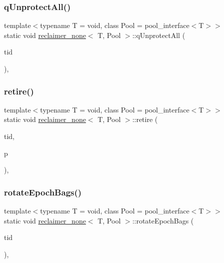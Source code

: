 \mbox{\label{classreclaimer__none_aeba1b3ef7a4aea47c3efb75a7547d0ce}} 
\subsubsection{\texorpdfstring{q\+Unprotect\+All()}{qUnprotectAll()}}
{\footnotesize\ttfamily template$<$typename T  = void, class Pool  = pool\+\_\+interface$<$\+T$>$$>$ \\
static void \hyperlink{classreclaimer__none}{reclaimer\+\_\+none}$<$ T, Pool $>$\+::q\+Unprotect\+All (\begin{DoxyParamCaption}\item[{const int}]{tid }\end{DoxyParamCaption})\hspace{0.3cm}{\ttfamily [inline]}, {\ttfamily [static]}}

\mbox{\label{classreclaimer__none_aa086c5d645d3ab8098b0015b9ed90489}} 
\subsubsection{\texorpdfstring{retire()}{retire()}}
{\footnotesize\ttfamily template$<$typename T  = void, class Pool  = pool\+\_\+interface$<$\+T$>$$>$ \\
static void \hyperlink{classreclaimer__none}{reclaimer\+\_\+none}$<$ T, Pool $>$\+::retire (\begin{DoxyParamCaption}\item[{const int}]{tid,  }\item[{T $\ast$}]{p }\end{DoxyParamCaption})\hspace{0.3cm}{\ttfamily [inline]}, {\ttfamily [static]}}

\mbox{\label{classreclaimer__none_a6ddaeb4e57e7b69d28cd01f16fd3e0a5}} 
\subsubsection{\texorpdfstring{rotate\+Epoch\+Bags()}{rotateEpochBags()}}
{\footnotesize\ttfamily template$<$typename T  = void, class Pool  = pool\+\_\+interface$<$\+T$>$$>$ \\
static void \hyperlink{classreclaimer__none}{reclaimer\+\_\+none}$<$ T, Pool $>$\+::rotate\+Epoch\+Bags (\begin{DoxyParamCaption}\item[{const int}]{tid }\end{DoxyParamCaption})\hspace{0.3cm}{\ttfamily [inline]}, {\ttfamily [static]}}

